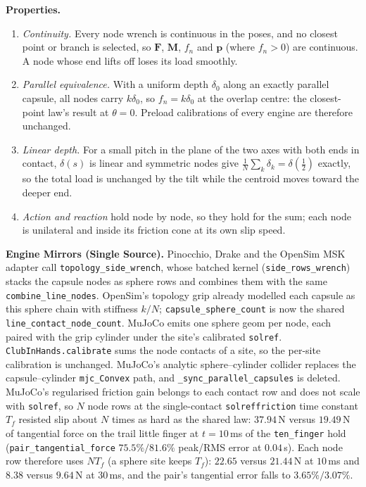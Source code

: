 \documentclass[11pt,a4paper]{article}
\begin{document}
\textbf{Properties.}
\begin{enumerate}[leftmargin=*,noitemsep]
\item \emph{Continuity.} Every node wrench is continuous in the poses, and no closest point or branch is selected, so
  $\mathbf{F}$, $\mathbf{M}$, $f_n$ and $\mathbf{p}$ (where $f_n > 0$) are continuous. A node whose end lifts off loses
  its load smoothly.
\item \emph{Parallel equivalence.} With a uniform depth $\delta_0$ along an exactly parallel capsule, all nodes carry
  $k\delta_0$, so $f_n = k\delta_0$ at the overlap centre: the closest-point law's result at $\theta = 0$. Preload
  calibrations of every engine are therefore unchanged.
\item \emph{Linear depth.} For a small pitch in the plane of the two axes with both ends in contact, $\delta(s)$ is linear and symmetric nodes give
  $\tfrac1N\sum_k\delta_k = \delta(\tfrac12)$ exactly, so the total load is unchanged by the tilt while the centroid moves
  toward the deeper end.
\item \emph{Action and reaction} hold node by node, so they hold for the sum; each node is unilateral and inside its
  friction cone at its own slip speed.
\end{enumerate}

\textbf{Engine Mirrors (Single Source).} Pinocchio, Drake and the OpenSim MSK adapter call
\texttt{topology\_side\_wrench}, whose batched kernel (\texttt{side\_rows\_wrench}) stacks the capsule nodes as sphere rows
and combines them with the same \texttt{combine\_line\_nodes}. OpenSim's topology grip already modelled each capsule as
this sphere chain with stiffness $k/N$; \texttt{capsule\_sphere\_count} is now the shared \texttt{line\_contact\_node\_count}.
MuJoCo emits one sphere geom per node, each paired with the grip cylinder under the site's calibrated \texttt{solref}.
\texttt{ClubInHands.calibrate} sums the node contacts of a site, so the per-site calibration is unchanged. MuJoCo's
analytic sphere--cylinder collider replaces the capsule--cylinder \texttt{mjc\_Convex} path, and
\texttt{\_sync\_parallel\_capsules} is deleted.
MuJoCo's regularised friction gain belongs to each contact row and does not scale with \texttt{solref}, so $N$ node rows
at the single-contact \texttt{solreffriction} time constant $T_f$ resisted slip about $N$ times as hard as the shared law:
$37.94$\,N versus $19.49$\,N of tangential force on the trail little finger at $t = 10$\,ms of the \texttt{ten\_finger}
hold (\texttt{pair\_tangential\_force} $75.5\% / 81.6\%$ peak/RMS error at $0.04$\,s). Each node row therefore uses
$N T_f$ (a sphere site keeps $T_f$): $22.65$ versus $21.44$\,N at $10$\,ms and $8.38$ versus $9.64$\,N at $30$\,ms, and the
pair's tangential error falls to $3.65\% / 3.07\%$.
\end{document}
